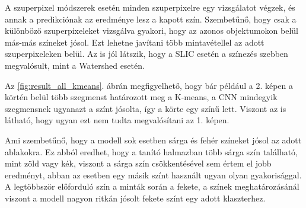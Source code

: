 A szuperpixel módszerek esetén minden szuperpixelre egy vizsgálatot végzek, és annak a predikciónak az eredménye lesz a kapott szín. Szembetűnő, hogy csak a különböző szuperpixeleket vizsgálva gyakori, hogy az azonos objektumokon belül más-más színeket jósol. Ezt lehetne javítani több mintavétellel az adott szuperpixeleken belül. Az is jól látszik, hogy a SLIC esetén a színezés szebben megvalósult, mint a Watershed esetén. 

Az \ref{fig:result_all_kmeans}. ábrán megfigyelhető, hogy bár például a 2. képen a körtén belül több szegmenst határozott meg a K-means, a CNN mindegyik szegmensnek ugyanazt a színt jósolta, így a körte egy színű lett. Viszont az is látható, hogy ugyan ezt nem tudta megvalósítani az 1. képen.

Ami szembetűnő, hogy a modell sok esetben sárga és fehér színeket jósol az adott ablakokra. Ez abból eredhet, hogy a tanító halmazban több sárga szín található, mint zöld vagy kék, viszont a sárga szín csökkentésével sem értem el jobb eredményt, abban az esetben egy másik színt használt ugyan olyan gyakorisággal. A legtöbbször előforduló szín a minták során a fekete, a színek meghatározásánál viszont a modell nagyon ritkán jósolt fekete színt egy adott klaszterhez. 

